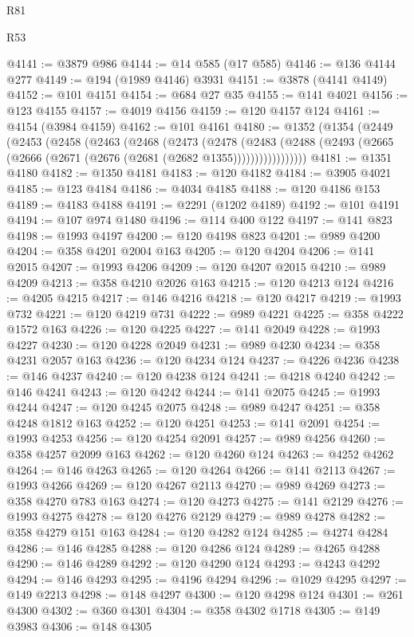 \begin{lexlean}{R81}
\begin{lexlean}{R53}
\begin{coremodule}
{{{{{{{{{{{{{{{{{{{{{{{{{{{{{{{{{{{{{{{{{{{{{{{{{{{{{{{{{{{{{{{{{{{{{{{{{{{{{{{{{{{{{{{{{{{{{{{{{{{{{{{{{{{{{{{{@4141 := @3879 @986
@4144 := @14 @585 (@17 @585)
@4146 := @136 @4144 @277
@4149 := @194 (@1989 @4146) @3931
@4151 := @3878 (@4141 @4149)
@4152 := @101 @4151
@4154 := @684 @27 @35
@4155 := @141 @4021
@4156 := @123 @4155
@4157 := @4019 @4156
@4159 := @120 @4157 @124
@4161 := @4154 (@3984 @4159)
@4162 := @101 @4161
@4180 := @1352
    (@1354
      (@2449
        (@2453
          (@2458
            (@2463
              (@2468
                (@2473
                  (@2478
                    (@2483
                      (@2488 (@2493 (@2665 (@2666 (@2671 (@2676 (@2681 (@2682 @1355)))))))))))))))))
@4181 := @1351 @4180
@4182 := @1350 @4181
@4183 := @120 @4182
@4184 := @3905 @4021
@4185 := @123 @4184
@4186 := @4034 @4185
@4188 := @120 @4186 @153
@4189 := @4183 @4188
@4191 := @2291 (@1202 @4189)
@4192 := @101 @4191
@4194 := @107 @974 @1480
@4196 := @114 @400 @122
@4197 := @141 @823
@4198 := @1993 @4197
@4200 := @120 @4198 @823
@4201 := @989 @4200
@4204 := @358 @4201 @2004 @163
@4205 := @120 @4204
@4206 := @141 @2015
@4207 := @1993 @4206
@4209 := @120 @4207 @2015
@4210 := @989 @4209
@4213 := @358 @4210 @2026 @163
@4215 := @120 @4213 @124
@4216 := @4205 @4215
@4217 := @146 @4216
@4218 := @120 @4217
@4219 := @1993 @732
@4221 := @120 @4219 @731
@4222 := @989 @4221
@4225 := @358 @4222 @1572 @163
@4226 := @120 @4225
@4227 := @141 @2049
@4228 := @1993 @4227
@4230 := @120 @4228 @2049
@4231 := @989 @4230
@4234 := @358 @4231 @2057 @163
@4236 := @120 @4234 @124
@4237 := @4226 @4236
@4238 := @146 @4237
@4240 := @120 @4238 @124
@4241 := @4218 @4240
@4242 := @146 @4241
@4243 := @120 @4242
@4244 := @141 @2075
@4245 := @1993 @4244
@4247 := @120 @4245 @2075
@4248 := @989 @4247
@4251 := @358 @4248 @1812 @163
@4252 := @120 @4251
@4253 := @141 @2091
@4254 := @1993 @4253
@4256 := @120 @4254 @2091
@4257 := @989 @4256
@4260 := @358 @4257 @2099 @163
@4262 := @120 @4260 @124
@4263 := @4252 @4262
@4264 := @146 @4263
@4265 := @120 @4264
@4266 := @141 @2113
@4267 := @1993 @4266
@4269 := @120 @4267 @2113
@4270 := @989 @4269
@4273 := @358 @4270 @783 @163
@4274 := @120 @4273
@4275 := @141 @2129
@4276 := @1993 @4275
@4278 := @120 @4276 @2129
@4279 := @989 @4278
@4282 := @358 @4279 @151 @163
@4284 := @120 @4282 @124
@4285 := @4274 @4284
@4286 := @146 @4285
@4288 := @120 @4286 @124
@4289 := @4265 @4288
@4290 := @146 @4289
@4292 := @120 @4290 @124
@4293 := @4243 @4292
@4294 := @146 @4293
@4295 := @4196 @4294
@4296 := @1029 @4295
@4297 := @149 @2213
@4298 := @148 @4297
@4300 := @120 @4298 @124
@4301 := @261 @4300
@4302 := @360 @4301
@4304 := @358 @4302 @1718
@4305 := @149 @3983
@4306 := @148 @4305
}}}}}}}}}}}}}}}}}}}}}}}}}}}}}}}}}}}}}}}}}}}}}}}}}}}}}}}}}}}}}}}}}}}}}}}}}}}}}}}}}}}}}}}}}}}}}}}}}}}}}}}}}}}}}}}}
\end{coremodule}
\end{lexlean}
\end{lexlean}
